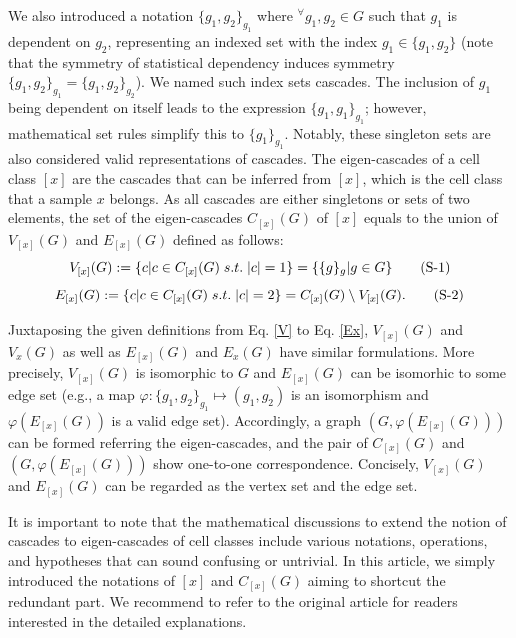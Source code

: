 \documentclass{article}
\begin{document}
We also introduced a notation $\{g_1, g_2\}_{g_1}$ where $^\forall g_1,g_2\in G$ such that $g_1$ is dependent on $g_2$, representing an 
indexed set with the index $g_1\in\{g_1, g_2\}$ (note that the symmetry of statistical dependency induces symmetry 
$\{g_1, g_2\}_{g_1}=\{g_1, g_2\}_{g_2}$). We named such index sets cascades. The inclusion of $g_1$ being dependent on itself leads to 
the expression $\{g_1, g_1\}_{g_1}$; however, mathematical set rules simplify this to $\{g_1\}_{g_1}$. Notably, these singleton sets are 
also considered valid representations of cascades. The eigen-cascades of a cell class $[x]$ are the cascades that can be 
inferred from $[x]$, which is the cell class that a sample $x$ belongs. As all cascades are either singletons or sets of two 
elements, the set of the eigen-cascades $C_{[x]}(G)$ of $[x]$ equals to the union of $V_{[x]}(G)$ and $E_{[x]}(G)$ defined as follows:
\begin{equation}\label{Vx}
  V_{[x]}(G):=\{c|c\in C_{[x]}(G)\; s.t.\; |c|=1\}=\{\{g\}_g|g\in G\}
  \stepcounter{equation} \tag{S-\theequation}
\end{equation}
\begin{equation}\label{Ex}
  E_{[x]}(G):=\{c|c\in C_{[x]}(G)\; s.t.\; |c|=2\}=C_{[x]}(G)\setminus V_{[x]}(G).
  \stepcounter{equation} \tag{S-\theequation}
\end{equation}

Juxtaposing the given definitions from Eq. \eqref{V} to Eq. \eqref{Ex}, $V_{[x]}(G)$ and $V_x(G)$ 
as well as $E_{[x]}(G)$ and $E_x(G)$ have similar formulations. More precisely, $V_{[x]}(G)$ is isomorphic to $G$ and 
$E_{[x]}(G)$ can be isomorhic to some edge set (e.g., a map $\varphi:\{g_1,g_2\}_{g_1}\mapsto(g_1,g_2)$ 
is an isomorphism and $\varphi(E_{[x]}(G))$ is a valid edge set). Accordingly, a graph $(G, \varphi(E_{[x]}(G)))$ can be formed 
referring the eigen-cascades, and the pair of $C_{[x]}(G)$ and $(G, \varphi(E_{[x]}(G)))$ show one-to-one correspondence.
Concisely, $V_{[x]}(G)$ and $E_{[x]}(G)$ can be regarded as the vertex set and the edge set.

It is important to note that the mathematical discussions to extend the notion of cascades to eigen-cascades of 
cell classes include various notations, operations, and hypotheses that can sound confusing or untrivial. 
In this article, we simply introduced the notations of $[x]$ and $C_{[x]}(G)$ aiming to shortcut the redundant part. 
We recommend to refer to the original article for readers interested in the detailed explanations.
\end{document}
